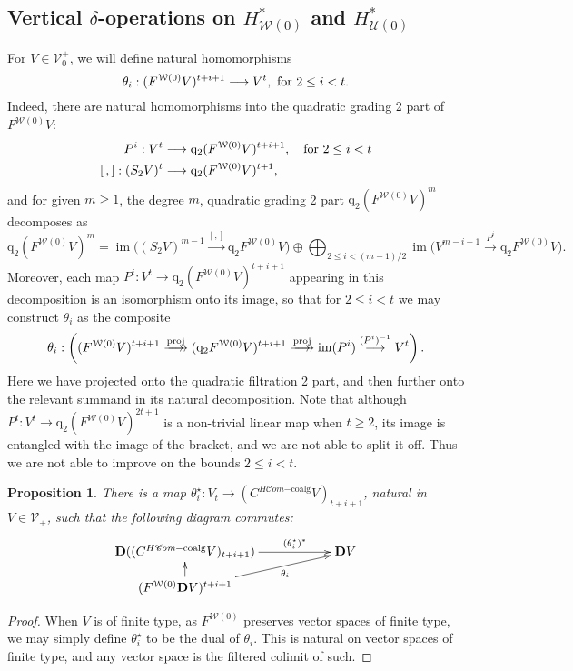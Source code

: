 \documentclass[11pt]{amsart} \renewcommand{\baselinestretch}{1.2}
\theoremstyle{plain}
\newtheorem{prop}[thm]{Proposition}
\theoremstyle{definition}
\DeclareMathOperator{\im}{im}
\renewcommand{\to}{\longrightarrow}
\newcommand{\scrC}{\mathscr{C}}
\newcommand{\calU}{\mathcal{U}}
\newcommand{\calV}{\mathcal{V}}
\newcommand{\calw}{\mathcal{W}}
\newcommand{\vect}[2]{\calV^{#1}_{#2}}
\newcommand{\HC}[1]{H#1\mathrm{-coalg}}
\newcommand{\quadgrad}[1]{\mathrm{q}_{#1}}
\newcommand{\ExtCohOp}{\mathrm{Sq}_\mathrm{ext}}
\newcommand{\algs}{{\scrC\!\textit{om}}}
\newcommand{\dual}{\mathbf{D}}
\begin{document}
\begin{Cohomology Operations for W and U}
\subsection{Vertical $\delta$-operations on $H^*_{\calw(0)}$ and $H^*_{\calU(0)}$}
For $V\in \vect{+}{0}$, we will define natural homomorphisms
\[\theta_i:(F^{\calw(0)}V)^{t+i+1}\to V^{t}, \textup{ for $2\leq i<t$}.\]
Indeed, there are natural homomorphisms into the quadratic grading 2 part of $F^{\calw(0)}V$:
\begin{align*}
P^i:V^{t}&\to \quadgrad{2}(F^{\calw(0)}V)^{t+i+1}, \textup{\quad  for $2\leq i<t$}\\
[\,,]:(S_2V)^{t}&\to \quadgrad{2}(F^{\calw(0)}V)^{t+1},
\end{align*}
and for given $m\geq1$, the degree $m$, quadratic grading 2 part $\quadgrad{2}(F^{\calw(0)}V)^m$ decomposes as
%
\[\quadgrad{2}(F^{\calw(0)}V)^{m}=%
\im \bigl((S_2V)^{m-1}\overset{[,]}{\to} \quadgrad{2}F^{\calw(0)}V\bigr)%
\oplus\bigoplus_{\!\!\!\!\!\!2\leq i< (m-1)/2\!\!\!\!\!\!}\im \bigl(V^{m-i-1}\overset{P^i}{\to}\quadgrad{2}F^{\calw(0)}V\bigr).\]
Moreover, each map $P^i:V^t\to \quadgrad{2}(F^{\calw(0)}V)^{t+i+1}$ appearing in this decomposition is an isomorphism onto its image, so that for $2\leq i <t$ we may construct $\theta_i$ as the composite
\[\theta_i:\left((F^{\calw(0)}V)^{t+i+1}\overset{\textup{proj}}{\makebox[.06ex][l]{$\to$}\to} (\quadgrad{2}F^{\calw(0)}V)^{t+i+1}\overset{\textup{proj}}{\makebox[.06ex][l]{$\to$}\to} \im (P^i)\overset{(P^i)^{-1}}{\to}V^{t}\right).\]
Here we have projected onto the quadratic filtration 2 part, and then further onto the relevant summand in its natural decomposition. Note that although $P^t:V^t\to \quadgrad{2}(F^{\calw(0)}V)^{2t+1}$ is a non-trivial linear map when $t\geq2$, its image is entangled with the image of the bracket, and we are not able to split it off. Thus we are not able to improve on the bounds $2\leq i< t$.
\begin{prop}
\label{prop on thetaistar}
There is a map $\theta_i^\star:V_t\to (C^{\HC{\algs}}V)_{t+i+1}$, natural in $V\in\vect{}{+}$, such that the following diagram commutes:
\[\xymatrix@R=4mm@C=20mm{
\dual((C^{\HC{\algs}}V)_{t+i+1})&%
\dual V\ar[l];[]^-{(\theta_i^\star)^*}
\\%
(F^{\calw(0)}\dual V)^{t+i+1}\ar[u]\ar[ur]_-{\theta_i}
}\]
\end{prop}
\begin{proof}
When $V$ is of finite type, as $F^{\calw(0)}$ preserves vector spaces of finite type, we may simply define $\theta_i^\star$ to be the dual of $\theta_i$. This is natural on vector spaces of finite type, and any vector space is the filtered colimit of such.
\end{proof}



\end{Cohomology Operations for W and U}
\end{document}
